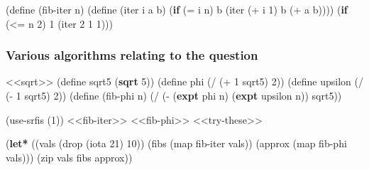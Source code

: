 \documentclass[
]{article}
\newenvironment{Shaded}{}{}
\newcommand{\DecValTok}[1]{\textcolor[rgb]{0.25,0.63,0.44}{#1}}
\newcommand{\ExtensionTok}[1]{#1}
\newcommand{\FunctionTok}[1]{\textcolor[rgb]{0.02,0.16,0.49}{#1}}
\newcommand{\KeywordTok}[1]{\textcolor[rgb]{0.00,0.44,0.13}{\textbf{#1}}}
\newcommand{\NormalTok}[1]{#1}
\newcommand{\OperatorTok}[1]{\textcolor[rgb]{0.40,0.40,0.40}{#1}}
\begin{document}
\hypertarget{fib-iter}{%
\label{fib-iter}}%
\begin{Shaded}
\begin{Highlighting}[numbers=left,,]
\NormalTok{(}\ExtensionTok{define}\FunctionTok{ }\NormalTok{(fib{-}iter n)}
\NormalTok{  (}\ExtensionTok{define}\FunctionTok{ }\NormalTok{(iter i a b)}
\NormalTok{    (}\KeywordTok{if}\NormalTok{ (}\OperatorTok{=}\NormalTok{ i n)}
\NormalTok{        b}
\NormalTok{    (iter (}\OperatorTok{+}\NormalTok{ i }\DecValTok{1}\NormalTok{)}
\NormalTok{          b}
\NormalTok{          (}\OperatorTok{+}\NormalTok{ a b))))}
\NormalTok{  (}\KeywordTok{if}\NormalTok{ (}\OperatorTok{\textless{}=}\NormalTok{ n }\DecValTok{2}\NormalTok{)}
      \DecValTok{1}
\NormalTok{      (iter }\DecValTok{2} \DecValTok{1} \DecValTok{1}\NormalTok{)))}
\end{Highlighting}
\end{Shaded}

\hypertarget{various-algorithms-relating-to-the-question}{%
\subsubsection{Various algorithms relating to the
question}\label{various-algorithms-relating-to-the-question}}

\hypertarget{fib-phi}{%
\label{fib-phi}}%
\begin{Shaded}
\begin{Highlighting}[numbers=left,,]
\NormalTok{\textless{}\textless{}sqrt\textgreater{}\textgreater{}}
\NormalTok{(}\ExtensionTok{define}\FunctionTok{ sqrt5}
\NormalTok{  (}\KeywordTok{sqrt} \DecValTok{5}\NormalTok{))}
\NormalTok{(}\ExtensionTok{define}\FunctionTok{ phi}
\NormalTok{  (}\OperatorTok{/}\NormalTok{ (}\OperatorTok{+} \DecValTok{1}\NormalTok{ sqrt5) }\DecValTok{2}\NormalTok{))}
\NormalTok{(}\ExtensionTok{define}\FunctionTok{ upsilon}
\NormalTok{  (}\OperatorTok{/}\NormalTok{ (}\OperatorTok{{-}} \DecValTok{1}\NormalTok{ sqrt5) }\DecValTok{2}\NormalTok{))}
\NormalTok{(}\ExtensionTok{define}\FunctionTok{ }\NormalTok{(fib{-}phi n)}
\NormalTok{  (}\OperatorTok{/}\NormalTok{ (}\OperatorTok{{-}}\NormalTok{ (}\KeywordTok{expt}\NormalTok{ phi n)}
\NormalTok{        (}\KeywordTok{expt}\NormalTok{ upsilon n))}
\NormalTok{     sqrt5))}
\end{Highlighting}
\end{Shaded}

\hypertarget{1-13-tab}{%
\label{1-13-tab}}%
\begin{Shaded}
\begin{Highlighting}[numbers=left,,]
\NormalTok{(use{-}srfis \textquotesingle{}(}\DecValTok{1}\NormalTok{))}
\NormalTok{\textless{}\textless{}fib{-}iter\textgreater{}\textgreater{}}
\NormalTok{\textless{}\textless{}fib{-}phi\textgreater{}\textgreater{}}
\NormalTok{\textless{}\textless{}try{-}these\textgreater{}\textgreater{}}

\NormalTok{(}\KeywordTok{let*}\NormalTok{ ((vals (drop (iota }\DecValTok{21}\NormalTok{) }\DecValTok{10}\NormalTok{))}
\NormalTok{       (fibs (map fib{-}iter vals))}
\NormalTok{       (approx (map fib{-}phi vals)))}
\NormalTok{  (zip vals fibs approx))}
\end{Highlighting}
\end{Shaded}
\end{document}
